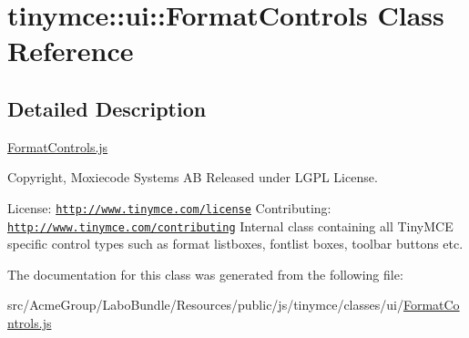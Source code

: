 \hypertarget{classtinymce_1_1ui_1_1_format_controls}{\section{tinymce\+:\+:ui\+:\+:Format\+Controls Class Reference}
\label{classtinymce_1_1ui_1_1_format_controls}
}


\subsection{Detailed Description}
\hyperlink{_format_controls_8js}{Format\+Controls.\+js}

Copyright, Moxiecode Systems A\+B Released under L\+G\+P\+L License.

License\+: \href{http://www.tinymce.com/license}{\tt http\+://www.\+tinymce.\+com/license} Contributing\+: \href{http://www.tinymce.com/contributing}{\tt http\+://www.\+tinymce.\+com/contributing} Internal class containing all Tiny\+M\+C\+E specific control types such as format listboxes, fontlist boxes, toolbar buttons etc. 

The documentation for this class was generated from the following file\+:\begin{DoxyCompactItemize}
\item 
src/\+Acme\+Group/\+Labo\+Bundle/\+Resources/public/js/tinymce/classes/ui/\hyperlink{_format_controls_8js}{Format\+Controls.\+js}\end{DoxyCompactItemize}
